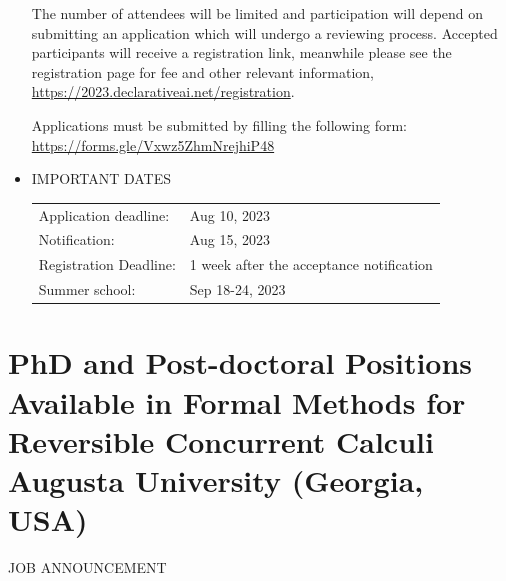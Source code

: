 \documentclass[prodmode,acmtecs]{acmsmall} %
\begin{document}
\begin{itemize}
   The number of attendees will be limited and participation will depend on submitting an application which will undergo a reviewing process. Accepted participants will receive a registration link, meanwhile please see the registration page for fee and other relevant information, \href{https://2023.declarativeai.net/registration}{https://2023.declarativeai.net/registration}. 
 
   Applications must be submitted by filling the following form: \href{https://forms.gle/Vxwz5ZhmNrejhiP48}{https://forms.gle/Vxwz5ZhmNrejhiP48} 
 
\item  IMPORTANT DATES 
 
\begin{tabulary}{\linewidth}{LL}Application deadline:  & Aug 10, 2023 \\
Notification:  & Aug 15, 2023 \\
Registration Deadline:  & 1 week after the acceptance notification \\
Summer school:  & Sep 18-24, 2023 \\
\end{tabulary}
 
\end{itemize}\section{PhD and Post-doctoral Positions Available in Formal Methods for Reversible Concurrent Calculi Augusta University (Georgia, USA)}\label{PhDandPostdoctoralPositionsAvailableinFormalMethodsforReversibleConcurrentCalculiAugustaUniversityGeorgiaUSA}JOB ANNOUNCEMENT 
\end{document}
